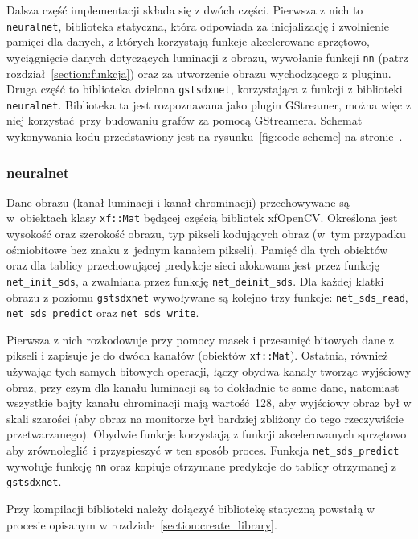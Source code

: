 \documentclass[12pt, oneside, a4paper]{article}
\begin{document}
Dalsza część implementacji składa się z dwóch części.
Pierwsza z nich to \lstinline{neuralnet}, biblioteka statyczna, która
odpowiada za inicjalizację i zwolnienie pamięci dla danych, z których
korzystają funkcje akcelerowane sprzętowo,
wyciągnięcie danych dotyczących luminacji z obrazu,
wywołanie funkcji \lstinline{nn} (patrz rozdział~\ref{section:funkcja}) oraz
za utworzenie obrazu wychodzącego z pluginu.
Druga część to biblioteka dzielona \lstinline{gstsdxnet}, korzystająca
z funkcji z biblioteki \lstinline{neuralnet}. Biblioteka ta jest rozpoznawana
jako plugin GStreamer, można więc z niej korzystać przy budowaniu
grafów za pomocą GStreamera. Schemat wykonywania kodu przedstawiony jest
na rysunku~\ref{fig:code-scheme} na stronie~\pageref{fig:code-scheme}.

\subsubsection{neuralnet}\label{sec:neuralnet}
Dane obrazu (kanał luminacji i kanał chrominacji)
przechowywane są w~obiektach klasy \lstinline{xf::Mat} będącej
częścią bibliotek xfOpenCV. Określona jest wysokość oraz szerokość obrazu,
typ pikseli kodujących obraz (w~tym przypadku ośmiobitowe bez znaku
z~jednym kanałem pikseli). Pamięć dla tych obiektów oraz dla tablicy
przechowującej predykcje sieci alokowana jest przez
funkcję \lstinline{net_init_sds}, a zwalniana przez funkcję
\lstinline{net_deinit_sds}. Dla każdej klatki obrazu z poziomu
\lstinline{gstsdxnet} wywoływane są kolejno trzy funkcje:
\lstinline{net_sds_read},
\lstinline{net_sds_predict} oraz
\lstinline{net_sds_write}.

Pierwsza z nich rozkodowuje przy pomocy masek i przesunięć bitowych
dane z pikseli i zapisuje je do dwóch kanałów (obiektów \lstinline{xf::Mat}).
Ostatnia, również używając tych samych bitowych operacji, łączy obydwa kanały
tworząc wyjściowy obraz, przy czym dla kanału luminacji są to dokładnie te
same dane, natomiast wszystkie bajty kanału chrominacji mają wartość 128,
aby wyjściowy obraz był w skali szarości (aby obraz na monitorze był bardziej
zbliżony do tego rzeczywiście przetwarzanego).
Obydwie funkcje korzystają z funkcji akcelerowanych
sprzętowo aby zrównoleglić i przyspieszyć w ten sposób proces.
Funkcja \lstinline{net_sds_predict} wywołuje funkcję \lstinline{nn} oraz
kopiuje otrzymane predykcje do tablicy otrzymanej z \lstinline{gstsdxnet}.

Przy kompilacji biblioteki należy dołączyć bibliotekę statyczną
powstałą w procesie opisanym w rozdziale~\ref{section:create_library}.
\end{document}
